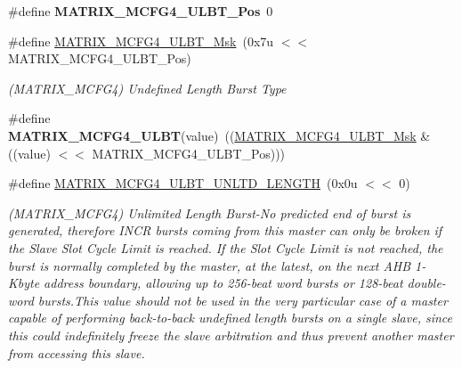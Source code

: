 \begin{DoxyCompactItemize}
\mbox{\label{group__SAMS70__MATRIX_ga00edf777c2276c71c5a0c1334be3c8eb}} 
\#define {\bfseries M\+A\+T\+R\+I\+X\+\_\+\+M\+C\+F\+G4\+\_\+\+U\+L\+B\+T\+\_\+\+Pos}~0
\item 
\mbox{\label{group__SAMS70__MATRIX_ga5ce6240b9f37c8b9e5abfb50ed77aec8}} 
\#define \mbox{\hyperlink{group__SAMS70__MATRIX_ga5ce6240b9f37c8b9e5abfb50ed77aec8}{M\+A\+T\+R\+I\+X\+\_\+\+M\+C\+F\+G4\+\_\+\+U\+L\+B\+T\+\_\+\+Msk}}~(0x7u $<$$<$ M\+A\+T\+R\+I\+X\+\_\+\+M\+C\+F\+G4\+\_\+\+U\+L\+B\+T\+\_\+\+Pos)
\begin{DoxyCompactList}\small\item\em (M\+A\+T\+R\+I\+X\+\_\+\+M\+C\+F\+G4) Undefined Length Burst Type \end{DoxyCompactList}\item 
\mbox{\label{group__SAMS70__MATRIX_ga2302d3a2e76ee5230265cf6893c8e2e3}} 
\#define {\bfseries M\+A\+T\+R\+I\+X\+\_\+\+M\+C\+F\+G4\+\_\+\+U\+L\+BT}(value)~((\mbox{\hyperlink{group__SAMS70__MATRIX_ga5ce6240b9f37c8b9e5abfb50ed77aec8}{M\+A\+T\+R\+I\+X\+\_\+\+M\+C\+F\+G4\+\_\+\+U\+L\+B\+T\+\_\+\+Msk}} \& ((value) $<$$<$ M\+A\+T\+R\+I\+X\+\_\+\+M\+C\+F\+G4\+\_\+\+U\+L\+B\+T\+\_\+\+Pos)))
\item 
\mbox{\label{group__SAMS70__MATRIX_ga46b538a8a9584ba352f74d9ddc7bc2d7}} 
\#define \mbox{\hyperlink{group__SAMS70__MATRIX_ga46b538a8a9584ba352f74d9ddc7bc2d7}{M\+A\+T\+R\+I\+X\+\_\+\+M\+C\+F\+G4\+\_\+\+U\+L\+B\+T\+\_\+\+U\+N\+L\+T\+D\+\_\+\+L\+E\+N\+G\+TH}}~(0x0u $<$$<$ 0)
\begin{DoxyCompactList}\small\item\em (M\+A\+T\+R\+I\+X\+\_\+\+M\+C\+F\+G4) Unlimited Length Burst-\/\+No predicted end of burst is generated, therefore I\+N\+CR bursts coming from this master can only be broken if the Slave Slot Cycle Limit is reached. If the Slot Cycle Limit is not reached, the burst is normally completed by the master, at the latest, on the next A\+HB 1-\/Kbyte address boundary, allowing up to 256-\/beat word bursts or 128-\/beat double-\/word bursts.\+This value should not be used in the very particular case of a master capable of performing back-\/to-\/back undefined length bursts on a single slave, since this could indefinitely freeze the slave arbitration and thus prevent another master from accessing this slave. \end{DoxyCompactList}\item 
$$
\end{DoxyCompactItemize}
